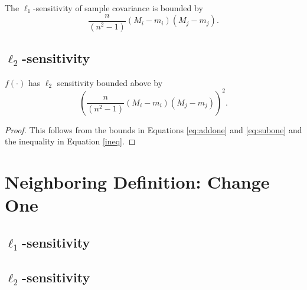 \documentclass[11pt]{scrartcl} %
\begin{document}
\begin{corollary}
The $\ell_1$-sensitivity of sample covariance is bounded by 
$$ \frac{n}{(n^2-1)}(M_i - m_i)(M_j - m_j).$$
\end{corollary}

\subsection{$\ell_2$-sensitivity}

\begin{theorem}
$f(\cdot)$ has $\ell_2$ sensitivity bounded above by 
$$\left(\frac{n}{(n^2-1)}(M_i - m_i)(M_j - m_j)\right)^2.$$
\end{theorem}

\begin{proof}
This follows from the bounds in Equations \ref{eq:addone} and \ref{eq:subone} and the inequality in Equation \ref{ineq}.
\end{proof}

\section{Neighboring Definition: Change One}
\subsection{$\ell_1$-sensitivity}

\subsection{$\ell_2$-sensitivity}



\end{document}
